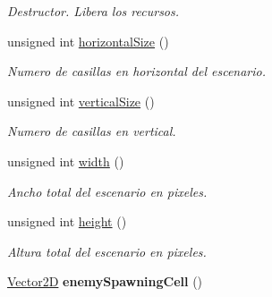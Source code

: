 \begin{DoxyCompactItemize}
\begin{DoxyCompactList}\small\item\em Destructor. Libera los recursos. \end{DoxyCompactList}\item 
unsigned int \hyperlink{class_scenario_a457b1626f68e6a2659aaf6a2038c7aa1}{horizontal\-Size} ()
\begin{DoxyCompactList}\small\item\em Numero de casillas en horizontal del escenario. \end{DoxyCompactList}\item 
unsigned int \hyperlink{class_scenario_a210693b48fbbc4b02ebc4824131ea0ad}{vertical\-Size} ()
\begin{DoxyCompactList}\small\item\em Numero de casillas en vertical. \end{DoxyCompactList}\item 
unsigned int \hyperlink{class_scenario_a2b098ae8cf7bfdbf9d281d72e241bb88}{width} ()
\begin{DoxyCompactList}\small\item\em Ancho total del escenario en pixeles. \end{DoxyCompactList}\item 
unsigned int \hyperlink{class_scenario_ad46654c66f78b69b2ceff9fbed9fd31d}{height} ()
\begin{DoxyCompactList}\small\item\em Altura total del escenario en pixeles. \end{DoxyCompactList}\item 
\hypertarget{class_scenario_a5c42393e886cffc17d929d518dfec392}{\hyperlink{class_vector2_d}{Vector2\-D} {\bfseries enemy\-Spawning\-Cell} ()}\label{class_scenario_a5c42393e886cffc17d929d518dfec392}


\end{DoxyCompactItemize}
